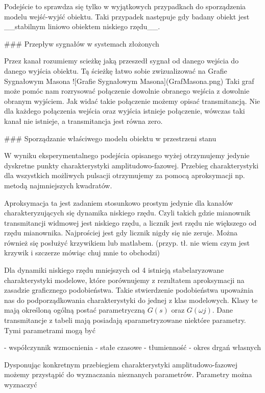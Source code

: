 \documentclass{article}
\begin{document}
	Podejście to sprawdza się tylko w wyjątkowych przypadkach
	do sporządzenia modelu wejść-wyjść obiektu.
	Taki przypadek następuje gdy badany obiekt jest __stabilnym liniowo
	obiektem niskiego rzędu__.

	### Przepływ sygnałów w systemach złożonych

	Przez kanał rozumiemy scieżkę jaką przeszedł sygnał od danego wejścia
	do danego wyjścia obiektu. Tą ścieżkę łatwo sobie zwizualizować na
	Grafie Sygnałowym Masona
	![Grafie Sygnałowym Masona](GrafMasona.png)
	Taki graf może pomóc nam rozrysować połączenie dowolnie obranego wejścia z
	dowolnie obranym wyjściem. Jak widać takie połączenie możemy opisać transmitancją.
	Nie dla każdego połączenia wejścia oraz wyjścia istnieje połączenie, wówczas taki
	kanał nie istnieje, a transmitancja jest równa zero.

	### Sporządzanie właściwego modelu obiektu w przestrzeni stanu

	W wyniku eksperymentalnego podejścia opisanego wyżej otrzymujemy jedynie dyskretne
	punkty charakterystyki amplitudowo-fazowej. Przebieg charakterystyki dla
	wszystkich możliwych pulsacji otrzymujemy za pomocą aproksymacji np.
	metodą najmniejszych kwadratów.

	Aproksymacja ta jest zadaniem stosunkowo prostym jedynie dla kanałów
	charakteryzujących się dynamika niskiego rzędu.
	Czyli takich gdzie mianownik transmitancji widmowej jest niskiego rzędu,
	a licznik jest rzędu nie większego od rzędu mianownika.
	Najprościej jest gdy licznik nigdy się nie zeruje.
	Można również się posłużyć krzywikiem lub matlabem.
	(przyp. tł. nie wiem czym jest krzywik i szczerze mówiąc chuj mnie to obchodzi)

	Dla dynamiki niskiego rzędu mniejszych od 4 istnieją stabelaryzowane charakterystyki
	modelowe, które porównujemy z rezultatem aproksymacji na zasadzie graficznego
	podobieństwa. Takie stwierdzenie podobieństwa upoważnia nas do podporządkowania
	charakterystyki do jednej z klas modelowych.
	Klasy te mają określoną ogólną postać parametryczną $G(s)$ oraz $G(\omega j)$.
	Dane transmitancje z tabeli mają posiadają sparametryzowane niektóre parametry.
	Tymi parametrami mogą być

	- współczynnik wzmocnienia
	- stałe czasowe
	- tłumienność
	- okres drgań własnych

	Dysponując konkretnym przebiegiem charakterystyki amplitudowo-fazowej możemy przystąpić
	do wyznaczania nieznanych parametrów. Parametry można wyznaczyć
\end{document}
